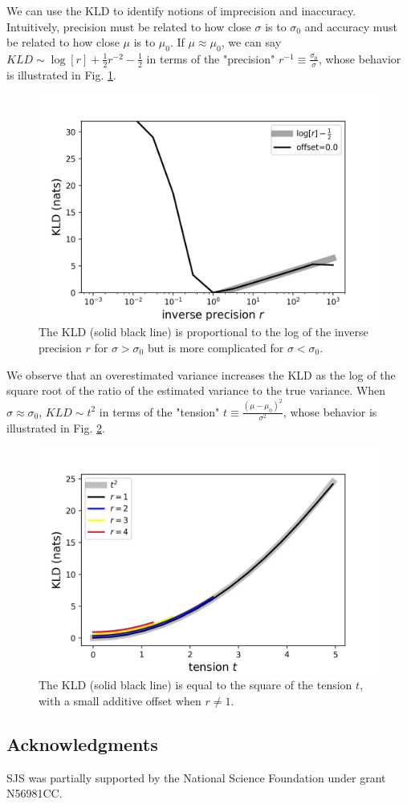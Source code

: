 \documentclass[\docopts]{\docclass}
\begin{document}
We can use the KLD to identify notions of imprecision and inaccuracy.  
Intuitively, precision must be related to how close $\sigma$ is to $\sigma_{0}$ 
and accuracy must be related to how close $\mu$ is to $\mu_{0}$.  If 
$\mu\approx\mu_{0}$, we can say $KLD\sim\log[r] + \frac{1}{2}r^{-2} - 
\frac{1}{2}$ in terms of the "precision" 
$r^{-1}\equiv\frac{\sigma_{0}}{\sigma}$, whose behavior is illustrated in Fig. 
\ref{fig:precision}.
\begin{figure}
  \includegraphics[width=0.9\columnwidth]{figures/kld_precision.png}
  \caption{The KLD (solid black line) is proportional to the log of the inverse 
precision $r$ for $\sigma>\sigma_{0}$ but is more complicated for 
$\sigma<\sigma_{0}$.
  \label{fig:precision}}
\end{figure}
We observe that an overestimated variance increases the KLD as the log of the 
square root of the ratio of the estimated variance to the true variance.  When 
$\sigma\approx\sigma_{0}$, $KLD\sim t^{2}$ in terms of the "tension" 
$t\equiv\frac{(\mu-\mu_{0})^{2}}{\sigma^{2}}$, whose behavior is illustrated in 
Fig. \ref{fig:tension}.
\begin{figure}
  \includegraphics[width=0.9\columnwidth]{figures/kld_tension.png}
  \caption{The KLD (solid black line) is equal to the square of the tension 
$t$, with a small additive offset when $r\neq1$.
  \label{fig:tension}}
\end{figure}

\subsection*{Acknowledgments}


SJS was partially supported by the National Science Foundation under grant 
N56981CC.








\end{document}
